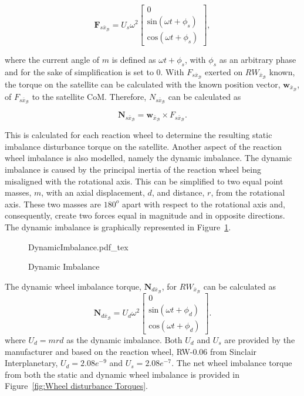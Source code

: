 \begin{equation}
\mathbf{F}_{s\bar{x}_\mathcal{B}} = U_s\omega^2 \begin{bmatrix} 0 \\ \text{sin}(\omega t + \phi_s) \\ \text{cos}(\omega t + \phi_s)\end{bmatrix},
\end{equation}

where the current angle of $m$ is defined as $\omega t + \phi_s$, with $\phi_s$ as an arbitrary phase and for the sake of simplification is set to $0$. With $F_{s\bar{x}_\mathcal{B}}$ exerted on $RW_{\bar{x}_\mathcal{B}}$ known, the torque on the satellite can be calculated with the known position vector, $\mathbf{w}_{\bar{x}_\mathcal{B}}$, of $F_{s\bar{x}_\mathcal{B}}$ to the satellite CoM. Therefore, $N_{s\bar{x}_\mathcal{B}}$ can be calculated as

\begin{equation}
\mathbf{N}_{s\bar{x}_\mathcal{B}} = \mathbf{w}_{\bar{x}_\mathcal{B}} \times F_{s\bar{x}_\mathcal{B}}.
\end{equation}

This is calculated for each reaction wheel to determine the resulting static imbalance disturbance torque on the satellite. Another aspect of the reaction wheel imbalance is also modelled, namely the dynamic imbalance. The dynamic imbalance is caused by the principal inertia of the reaction wheel being misaligned with the rotational axis. This can be simplified to two equal point masses, $m$, with an axial displacement, $d$, and distance, $r$, from the rotational axis. These two masses are $\num{180}^o$ apart with respect to the rotational axis and, consequently, create two forces equal in magnitude and in opposite directions. The dynamic imbalance is graphically represented in Figure~\ref{fig:DynamicImbalance}.

\begin{figure}[!htb]
	\centering
	\def\svgwidth{10cm}
	{DynamicImbalance.pdf_tex}
	\caption{Dynamic Imbalance}
	\label{fig:DynamicImbalance}
\end{figure}

The dynamic wheel imbalance torque, $\mathbf{N}_{d\bar{x}_\mathcal{B}}$, for $RW_{\bar{x}_\mathcal{B}}$ can be calculated as 
\begin{equation}
\mathbf{N}_{d\bar{x}_\mathcal{B}} = U_d\omega^2 \begin{bmatrix} 0 \\ \text{sin}(\omega t + \phi_d) \\ \text{cos}(\omega t + \phi_d)\end{bmatrix}.
\end{equation}
where $U_d = mrd$ as the dynamic imbalance. Both $U_d$ and $U_s$ are provided by the manufacturer and based on the reaction wheel, RW-0.06 from Sinclair Interplanetary, $U_d = 2.08e^{-9}$ and $U_s = 2.08e^{-7}$. The net wheel imbalance torque from both the static and dynamic wheel imbalance is provided in Figure~\ref{fig:Wheel disturbance Torques}.

